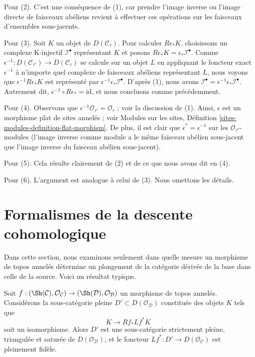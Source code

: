\medskip\noindent
Pour (2). C'est une conséquence de (1), car prendre l'image inverse ou
l'image directe de faisceaux abéliens revient à effectuer ces opérations
sur les faisceaux d'ensembles sous-jacents.

\medskip\noindent
Pour (3). Soit $K$ un objet de $D(\mathcal{C}_\tau)$. Pour calculer
$R\epsilon_*K$, choisissons un complexe K-injectif
$\mathcal{I}^\bullet$ représentant $K$ et posons
$R\epsilon_*K = \epsilon_*\mathcal{I}^\bullet$. Comme
$\epsilon^{-1} : D(\mathcal{C}_{\tau'}) \to D(\mathcal{C}_\tau)$ se
calcule sur un objet $L$ en appliquant le foncteur exact $\epsilon^{-1}$ à
n'importe quel complexe de faisceaux abéliens représentant $L$, nous
voyons que $\epsilon^{-1}R\epsilon_*K$ est représenté par
$\epsilon^{-1}\epsilon_*\mathcal{I}^\bullet$. D'après (1), nous avons
$\mathcal{I}^\bullet = \epsilon^{-1}\epsilon_*\mathcal{I}^\bullet$.
Autrement dit, $\epsilon^{-1} \circ R\epsilon_* = \text{id}$, et nous
concluons comme précédemment.

\medskip\noindent
Pour (4). Observons que
$\epsilon^{-1}\mathcal{O}_{\tau'} = \mathcal{O}_\tau$ ; voir la discussion
de (1). Ainsi, $\epsilon$ est un morphisme plat de sites annelés ; voir
Modules sur les sites, Définition
\ref{sites-modules-definition-flat-morphism}. De plus, il est clair que
$\epsilon^* = \epsilon^{-1}$ sur les $\mathcal{O}_{\tau'}$-modules
(l'image inverse comme module a le même faisceau abélien sous-jacent que
l'image inverse du faisceau abélien sous-jacent).

\medskip\noindent
Pour (5). Cela résulte clairement de (2) et de ce que nous avons dit en (4).

\medskip\noindent
Pour (6). L'argument est analogue à celui de (3). Nous omettons les détails.












\section{Formalismes de la descente cohomologique}
\label{section-formal-cohomological-descent}

\noindent
Dans cette section, nous examinons seulement dans quelle mesure un
morphisme de topos annelés détermine un plongement de la catégorie dérivée
de la base dans celle de la source. Voici un résultat typique.

\begin{lemma}
\label{lemma-downstairs}
Soit $f : (\Sh(\mathcal{C}), \mathcal{O}_\mathcal{C}) \to
(\Sh(\mathcal{D}), \mathcal{O}_\mathcal{D})$ un morphisme de topos annelés.
Considérons la sous-catégorie pleine
$D' \subset D(\mathcal{O}_\mathcal{D})$ constituée des objets $K$ tels que
$$
K \longrightarrow Rf_*Lf^*K
$$
soit un isomorphisme. Alors $D'$ est une sous-catégorie strictement pleine,
triangulée et saturée de $D(\mathcal{O}_\mathcal{D})$, et le foncteur
$Lf^* : D' \to D(\mathcal{O}_\mathcal{C})$ est pleinement fidèle.
\end{lemma}

